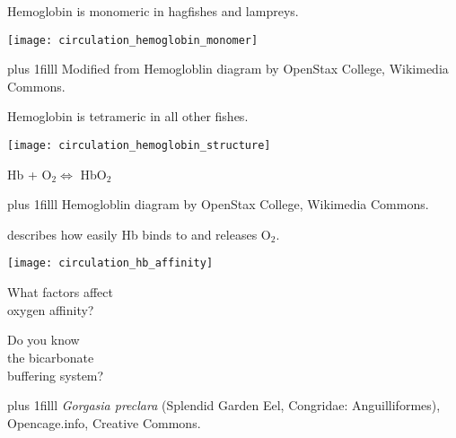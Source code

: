 \documentclass[t,handout]{beamer}  %
\begin{document}
\begin{frame}[c,plain]{Hemoglobin is monomeric in hagfishes and lampreys.}

\vspace{\baselineskip}

\centering
\texttt{[image: circulation\_hemoglobin\_monomer]}

\vskip0pt plus 1filll
\hfill\tiny Modified from Hemogloblin diagram by OpenStax College, Wikimedia Commons.
\end{frame}


\begin{frame}[c,plain]{Hemoglobin is tetrameric in all other fishes.}

\vspace{\baselineskip}

\centering
\texttt{[image: circulation\_hemoglobin\_structure]}

Hb + O$_2 \Longleftrightarrow $ HbO$_2$

\vskip0pt plus 1filll
\hfill\tiny Hemogloblin diagram by OpenStax College, Wikimedia Commons.
\end{frame}

\begin{frame}[c,plain]{ describes how easily Hb binds to and releases O$_2$.}

\centering
\texttt{[image: circulation\_hb\_affinity]}

\pause


\end{frame}



{
\begin{frame}[t,plain]

\vspace{2\baselineskip}

\hangpara What factors affect\\  oxygen affinity?

\vspace{4em}

\hangpara Do you know\\ the bicarbonate\\ buffering system?

\vskip0pt plus 1filll
\hfill\tiny\textit{Gorgasia preclara} (Splendid Garden Eel, Congridae: Anguilliformes),\\
\hfill\tiny  Opencage.info, Creative Commons.
\end{frame}
}
\end{document}
